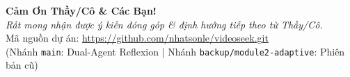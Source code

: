 \documentclass[aspectratio=169, 10pt]{beamer}
\begin{document}
\begin{frame}
    \vspace{1.5cm}
    \centering
    \Huge \textbf{\textcolor{primaryBlue}{Cảm Ơn Thầy/Cô \& Các Bạn!}} \\
    \vspace{0.8cm}
    \normalsize \textit{Rất mong nhận được ý kiến đóng góp \& định hướng tiếp theo từ Thầy/Cô.} \\
    \vspace{0.5cm}
    \small
    Mã nguồn dự án: \url{https://github.com/nhatsonle/videoseek.git} \\
    \footnotesize (Nhánh \texttt{main}: Dual-Agent Reflexion | Nhánh \texttt{backup/module2-adaptive}: Phiên bản cũ)
\end{frame}
\end{document}
